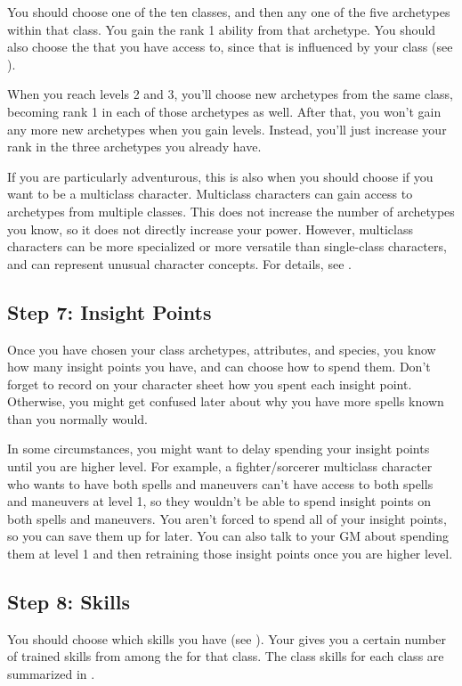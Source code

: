         You should choose one of the ten classes, and then any one of the five archetypes within that class.
        You gain the rank 1 ability from that archetype.
        You should also choose the  that you have access to, since that is influenced by your class (see ).

        When you reach levels 2 and 3, you'll choose new archetypes from the same class, becoming rank 1 in each of those archetypes as well.
        After that, you won't gain any more new archetypes when you gain levels.
        Instead, you'll just increase your rank in the three archetypes you already have.

        If you are particularly adventurous, this is also when you should choose if you want to be a multiclass character.
        Multiclass characters can gain access to archetypes from multiple classes.
        This does not increase the number of archetypes you know, so it does not directly increase your power.
        However, multiclass characters can be more specialized or more versatile than single-class characters, and can represent unusual character concepts.
        For details, see .

    \subsection{Step 7: Insight Points}
        Once you have chosen your class archetypes, attributes, and species, you know how many insight points you have, and can choose how to spend them.
        Don't forget to record on your character sheet how you spent each insight point.
        Otherwise, you might get confused later about why you have more spells known than you normally would.

        In some circumstances, you might want to delay spending your insight points until you are higher level.
        For example, a fighter/sorcerer multiclass character who wants to have both spells and maneuvers can't have access to both spells and maneuvers at level 1, so they wouldn't be able to spend insight points on both spells and maneuvers.
        You aren't forced to spend all of your insight points, so you can save them up for later.
        You can also talk to your GM about spending them at level 1 and then retraining those insight points once you are higher level.

    \subsection{Step 8: Skills}
        You should choose which skills you have  (see ).
        Your  gives you a certain number of trained skills from among the  for that class.
        The class skills for each class are summarized in .

